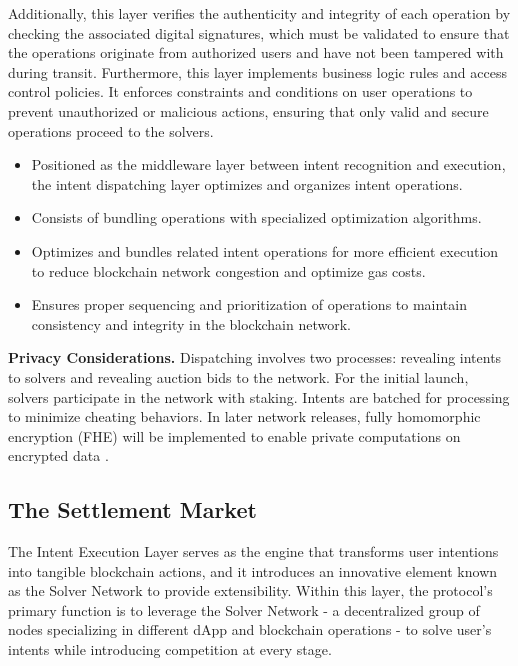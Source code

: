 \documentclass[11pt,letterpaper,twocolumn]{article}
\begin{document}
Additionally, this layer verifies the authenticity and integrity of each operation by checking the associated digital signatures, which must be validated to ensure that the operations originate from authorized users and have not been tampered with during transit. Furthermore, this layer implements business logic rules and access control policies. It enforces constraints and conditions on user operations to prevent unauthorized or malicious actions, ensuring that only valid and secure operations proceed to the solvers.

\begin{itemize}
    \item Positioned as the middleware layer between intent recognition and execution, the intent dispatching layer optimizes and organizes intent operations.

    \item Consists of bundling operations with specialized optimization algorithms.
    
    \item Optimizes and bundles related intent operations for more efficient execution to reduce blockchain network congestion and optimize gas costs.

    \item Ensures proper sequencing and prioritization of operations to maintain consistency and integrity in the blockchain network.
\end{itemize}
\newline
\newline
\noindent \textbf{Privacy Considerations.} Dispatching involves two processes:
revealing intents to solvers and revealing auction bids
to the network. For the initial launch, solvers participate
in the network with staking. Intents are batched for
processing to minimize cheating behaviors. In later network releases, fully homomorphic encryption (FHE) will be implemented to enable private computations on encrypted data \cite{fhe2023zama}.

\subsection{The Settlement Market}
The Intent Execution Layer serves as the engine that transforms user intentions into tangible blockchain actions, and it introduces an innovative element known as the Solver Network to provide extensibility. Within this layer, the protocol’s primary function is to leverage the Solver Network - a decentralized group of nodes specializing in different dApp and blockchain operations - to solve user’s intents while introducing competition at every stage.
\end{document}
